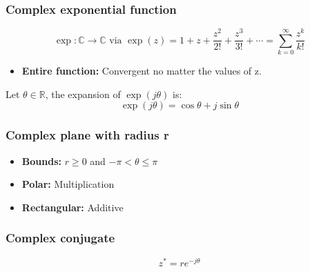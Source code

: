     \subsubsection{Complex exponential function}
    \begin{definition}
        \begin{equation}
            \exp: \mathbb{C} \to \mathbb{C} \text{ via } \exp(z) = 1 + z + \frac{z^2}{2!} + \frac{z^3}{3!} + \cdots = \sum_{k=0}^{\infty} \frac{z^k}{k!}    
        \end{equation}
        \begin{itemize}
            \item \textbf{Entire function:} Convergent no matter the values of z.
        \end{itemize}
        
        Let \( \theta \in \mathbb{R} \), the expansion of \( \exp(j\theta) \) is:
        \begin{equation}
            \exp(j\theta) = \cos \theta + j \sin \theta 
        \end{equation}
    \end{definition}

    \subsubsection{Complex plane with radius r}
    \begin{intuition}

        \begin{itemize}
            \item \textbf{Bounds:} $r \geq 0$ and $-\pi < \theta \leq \pi$
            \item \textbf{Polar:} Multiplication
            \item \textbf{Rectangular:} Additive
        \end{itemize}
    \end{intuition}

    \subsubsection{Complex conjugate}
    \begin{definition}
        \begin{equation}
            z^* = re^{-j\theta}
        \end{equation}
    \end{definition}

